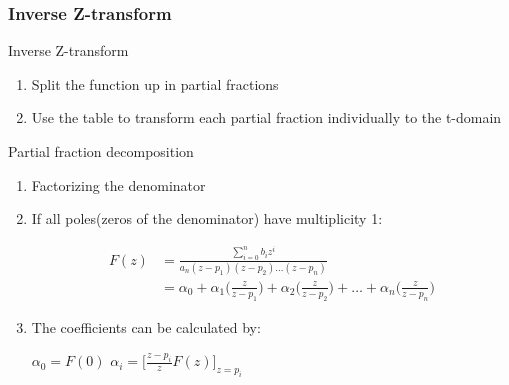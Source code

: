 \begin{frame}
	\frametitle{Inverse Z-transform}
	\begin{block}{Inverse Z-transform}
		\begin{enumerate}
			\item Split the function up in partial fractions
			\item Use the table to transform each partial fraction individually to the t-domain
		\end{enumerate}
	\end{block}
	
\end{frame}
\begin{frame}
	\begin{block}{Partial fraction decomposition}
		\begin{enumerate}
			\item Factorizing the denominator
			\item If all poles(zeros of the denominator) have multiplicity 1:
			\vspace{-2 em}
			\begin{center}
				\begin{align}
				F(z) &= \frac{\sum\limits_{i=0}^{n} b_i z^{i}}{a_n(z-p_1)(z-p_2) \dots (z-p_n)}\\
				&= \alpha_0 + \alpha_1 \bigg(\frac{z}{z-p_1}\bigg) + \alpha_2 \bigg(\frac{z}{z-p_2}\bigg) + \dots + \alpha_n \bigg(\frac{z}{z-p_n}\bigg)
				\end{align}
			\end{center}
			\item The coefficients can be calculated by:\\
			\begin{center}
				$\alpha_0 = F(0)$		$\alpha_i = \bigg[\frac{z-p_i}{z} F(z)\bigg]_{z=p_i}$
			\end{center}
			\setcounter{enumTemp}{\theenumi}
		\end{enumerate}
	\end{block}
\end{frame}
